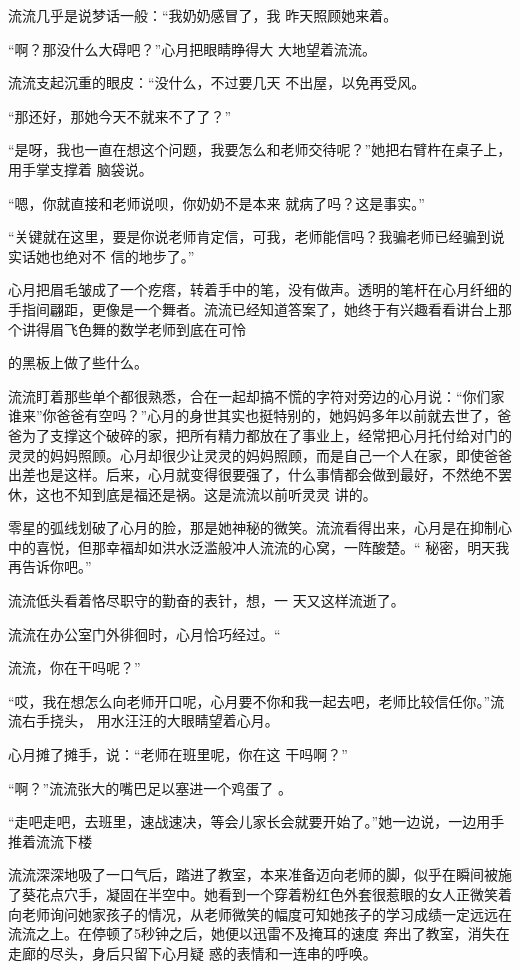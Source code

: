 \documentclass{article}
\begin{document}
流流几乎是说梦话一般：“我奶奶感冒了，我
昨天照顾她来着。 

“啊？那没什么大碍吧？”心月把眼睛睁得大
大地望着流流。 

\newpage

流流支起沉重的眼皮：“没什么，不过要几天
不出屋，以免再受风。 


“那还好，那她今天不就来不了了？” 

“是呀，我也一直在想这个问题，我要怎么和老师交待呢？”她把右臂杵在桌子上，用手掌支撑着
脑袋说。 

“嗯，你就直接和老师说呗，你奶奶不是本来
就病了吗？这是事实。” 

“关键就在这里，要是你说老师肯定信，可我，老师能信吗？我骗老师已经骗到说实话她也绝对不
信的地步了。” 

心月把眉毛皱成了一个疙瘩，转着手中的笔，没有做声。透明的笔杆在心月纤细的手指间翩距，更像是一个舞者。流流已经知道答案了，她终于有兴趣看看讲台上那个讲得眉飞色舞的数学老师到底在可怜

\newpage
的黑板上做了些什么。 

流流盯着那些单个都很熟悉，合在一起却搞不慌的字符对旁边的心月说：“你们家谁来”你爸爸有空吗？”心月的身世其实也挺特别的，她妈妈多年以前就去世了，爸爸为了支撑这个破碎的家，把所有精力都放在了事业上，经常把心月托付给对门的灵灵的妈妈照顾。心月却很少让灵灵的妈妈照顾，而是自己一个人在家，即使爸爸出差也是这样。后来，心月就变得很要强了，什么事情都会做到最好，不然绝不罢休，这也不知到底是福还是祸。这是流流以前听灵灵
讲的。 

零星的弧线划破了心月的脸，那是她神秘的微笑。流流看得出来，心月是在抑制心中的喜悦，但那幸福却如洪水泛滥般冲人流流的心窝，一阵酸楚。“
秘密，明天我再告诉你吧。” 

流流低头看着恪尽职守的勤奋的表针，想，一
天又这样流逝了。 

流流在办公室门外徘徊时，心月恰巧经过。“
\newpage

流流，你在干吗呢？” 

“哎，我在想怎么向老师开口呢，心月要不你和我一起去吧，老师比较信任你。”流流右手挠头，
用水汪汪的大眼睛望着心月。 

心月摊了摊手，说：“老师在班里呢，你在这
干吗啊？” 

“啊？”流流张大的嘴巴足以塞进一个鸡蛋了
。 

“走吧走吧，去班里，速战速决，等会儿家长会就要开始了。”她一边说，一边用手推着流流下楼

流流深深地吸了一口气后，踏进了教室，本来准备迈向老师的脚，似乎在瞬间被施了葵花点穴手，凝固在半空中。她看到一个穿着粉红色外套很惹眼的女人正微笑着向老师询问她家孩子的情况，从老师微笑的幅度可知她孩子的学习成绩一定远远在流流之上。在停顿了5秒钟之后，她便以迅雷不及掩耳的速度
\newpage
奔出了教室，消失在走廊的尽头，身后只留下心月疑
惑的表情和一连串的呼唤。 
\end{document}
